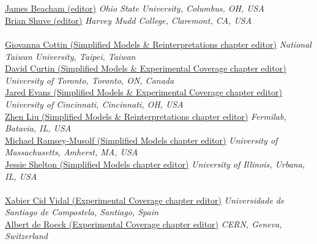 \text{\textcolor{red}{Is your name missing?  Let us know!}}\\
\text{ \; }\\

\noindent\href{mailto:j.beacham@cern.ch}{James Beacham (editor)} 
\emph{Ohio State University, Columbus, OH, USA}\\

\noindent\href{mailto:bshuve@g.hmc.edu}{Brian Shuve (editor)} 
\emph{Harvey Mudd College, Claremont, CA, USA}\\

\text{ \; }\\

\noindent\href{mailto:gcottin@phys.ntu.edu.tw}{Giovanna Cottin (Simplified Models \& Reinterpretations chapter editor)} 
\emph{National Taiwan University, Taipei, Taiwan}\\

\noindent\href{mailto:david.r.curtin@gmail.com}{David Curtin (Simplified Models \& Experimental Coverage chapter editor)} 
\emph{University of Toronto, Toronto, ON, Canada}\\

\noindent\href{mailto:jaevans@ucdavis.edu}{Jared Evans (Simplified Models \& Experimental Coverage chapter editor)} 
\emph{University of Cincinnati, Cincinnati, OH, USA}\\

\noindent\href{mailto:zliu2@fnal.gov}{Zhen Liu (Simplified Models \& Reinterpretations chapter editor)} 
\emph{Fermilab, Batavia, IL, USA}\\

\noindent\href{mailto:mjrm@physics.umass.edu}{Michael Ramsey-Musolf (Simplified Models chapter editor)} 
\emph{University of Massachusetts, Amherst, MA, USA}\\

\noindent\href{mailto:jshelton137@gmail.com}{Jessie Shelton (Simplified Models chapter editor)} 
\emph{University of Illinois, Urbana, IL, USA}\\

\text{ \; }\\

\noindent\href{mailto:xabier.cid.vidal@cern.ch}{Xabier Cid Vidal (Experimental Coverage chapter editor)} 
\emph{Universidade de Santiago de Compostela, Santiago, Spain}\\

\noindent\href{mailto:Albert.de.Roeck@cern.ch}{Albert de Roeck (Experimental Coverage chapter editor)}
\emph{CERN, Geneva, Switzerland}\\

